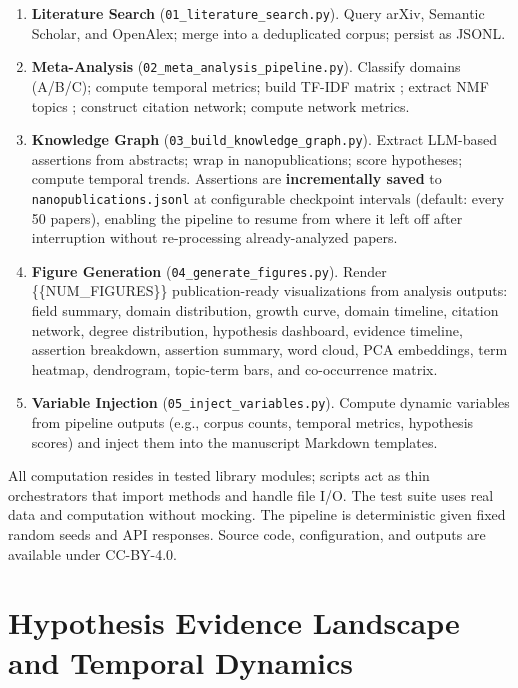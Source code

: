 \documentclass[
]{article}
\begin{document}
\begin{enumerate}
\def\labelenumi{\arabic{enumi}.}
\item
  \textbf{Literature Search} (\texttt{01\_literature\_search.py}). Query
  arXiv, Semantic Scholar, and OpenAlex; merge into a deduplicated
  corpus; persist as JSONL.
\item
  \textbf{Meta-Analysis} (\texttt{02\_meta\_analysis\_pipeline.py}).
  Classify domains (A/B/C); compute temporal metrics; build TF-IDF
  matrix \citep{salton1975vector}; extract NMF topics
  \citep{lee1999nmf}; construct citation network; compute network
  metrics.
\item
  \textbf{Knowledge Graph} (\texttt{03\_build\_knowledge\_graph.py}).
  Extract LLM-based assertions from abstracts; wrap in nanopublications;
  score hypotheses; compute temporal trends. Assertions are
  \textbf{incrementally saved} to \texttt{nanopublications.jsonl} at
  configurable checkpoint intervals (default: every 50 papers), enabling
  the pipeline to resume from where it left off after interruption
  without re-processing already-analyzed papers.
\item
  \textbf{Figure Generation} (\texttt{04\_generate\_figures.py}). Render
  \{\{NUM\_FIGURES\}\} publication-ready visualizations from analysis
  outputs: field summary, domain distribution, growth curve, domain
  timeline, citation network, degree distribution, hypothesis dashboard,
  evidence timeline, assertion breakdown, assertion summary, word cloud,
  PCA embeddings, term heatmap, dendrogram, topic-term bars, and
  co-occurrence matrix.
\item
  \textbf{Variable Injection} (\texttt{05\_inject\_variables.py}).
  Compute dynamic variables from pipeline outputs (e.g., corpus counts,
  temporal metrics, hypothesis scores) and inject them into the
  manuscript Markdown templates.
\end{enumerate}

All computation resides in tested library modules; scripts act as thin
orchestrators that import methods and handle file I/O. The test suite
uses real data and computation without mocking. The pipeline is
deterministic given fixed random seeds and API responses. Source code,
configuration, and outputs are available under CC-BY-4.0.

\newpage

\section{\texorpdfstring{Hypothesis Evidence Landscape and Temporal
Dynamics
\label{sec:hypothesis_results}}{Hypothesis Evidence Landscape and Temporal Dynamics }}\label{hypothesis-evidence-landscape-and-temporal-dynamics}
\end{document}

